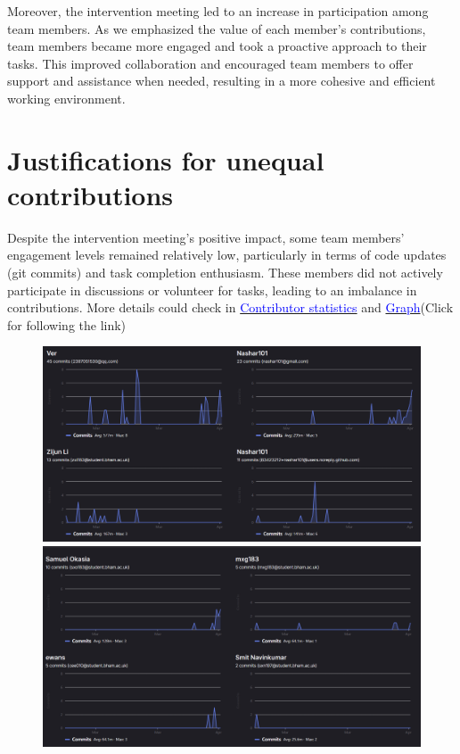 \documentclass[a4paper]{article}
\begin{document}
Moreover, the intervention meeting led to an increase in participation among team members. As we emphasized the value of each member's contributions, team members became more engaged and took a proactive approach to their tasks. This improved collaboration and encouraged team members to offer support and assistance when needed, resulting in a more cohesive and efficient working environment.

\section*{Justifications for unequal contributions}

Despite the intervention meeting's positive impact, some team members' engagement levels remained relatively low, particularly in terms of code updates (git commits) and task completion enthusiasm. These members did not actively participate in discussions or volunteer for tasks, leading to an imbalance in contributions. More details could check in \href{https://git.cs.bham.ac.uk/team-projects-2022-23/team23-22/-/graphs/main?ref_type=heads}{\textcolor{blue}{Contributor statistics}} and \href{https://git.cs.bham.ac.uk/team-projects-2022-23/team23-22/-/network/main?ref_type=heads}{\textcolor{blue}{Graph}}(Click for following the link)

\begin{figure}[H]
    \centering
    \begin{minipage}{0.49\textwidth}
      \centering
      \includegraphics[width=\linewidth]{./image/Contributor_1.png}
    \end{minipage}\hfill
    \begin{minipage}{0.49\textwidth}
      \centering
      \includegraphics[width=\linewidth]{./image/Contributor_2.png}
    \end{minipage}
\end{figure}
\end{document}
